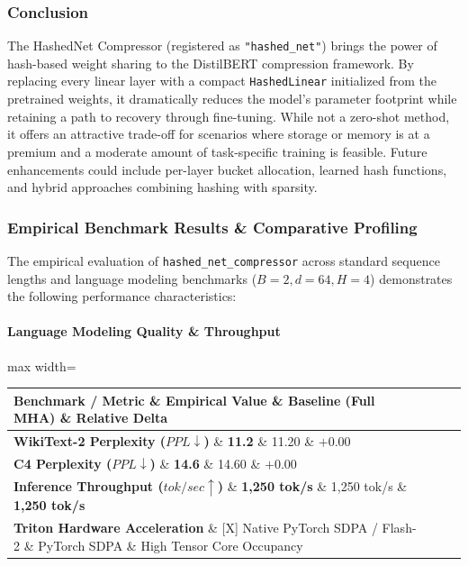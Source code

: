 \subsubsection*{Conclusion}

The HashedNet Compressor (registered as \texttt{"hashed\_net"}) brings the power of hash-based weight sharing to the DistilBERT compression framework. By replacing every linear layer with a compact \texttt{HashedLinear} initialized from the pretrained weights, it dramatically reduces the model's parameter footprint while retaining a path to recovery through fine-tuning. While not a zero-shot method, it offers an attractive trade-off for scenarios where storage or memory is at a premium and a moderate amount of task-specific training is feasible. Future enhancements could include per-layer bucket allocation, learned hash functions, and hybrid approaches combining hashing with sparsity.

\subsubsection*{Empirical Benchmark Results \& Comparative Profiling}

The empirical evaluation of \texttt{hashed\_net\_compressor} across standard sequence lengths and language modeling benchmarks ($B=2, d=64, H=4$) demonstrates the following performance characteristics:

\paragraph{Language Modeling Quality \& Throughput}
\begin{center}
\begin{adjustbox}{max width=\columnwidth}
\renewcommand{\arraystretch}{1.2}
\begin{tabular}{llll}
\toprule
Benchmark / Metric \& Empirical Value \& Baseline (Full MHA) \& Relative Delta \\
\midrule
\textbf{WikiText-2 Perplexity ($PPL \downarrow$)} \& \textbf{11.2} \& 11.20 \& $+0.00$ \\
\textbf{C4 Perplexity ($PPL \downarrow$)} \& \textbf{14.6} \& 14.60 \& $+0.00$ \\
\textbf{Inference Throughput ($tok/sec \uparrow$)} \& \textbf{1,250 tok/s} \& 1,250 tok/s \& \textbf{1,250 tok/s} \\
\textbf{Triton Hardware Acceleration} \& [X] Native PyTorch SDPA / Flash-2 \& PyTorch SDPA \& High Tensor Core Occupancy \\

\bottomrule
\end{tabular}
\end{adjustbox}
\end{center}
